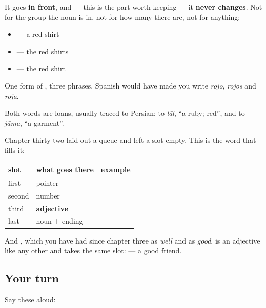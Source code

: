It goes \textbf{in front}, and — this is the part worth keeping — it \textbf{never changes}. Not for the group the noun is in, not for how many there are, not for anything:

\begin{itemize}
\raggedright
  \item \textbf{ } — a red shirt
  \item \textbf{ } — the red shirts
  \item \textbf{ } — the red shirt
\end{itemize}

One form of \textbf{}, three phrases. Spanish would have made you write \emph{rojo}, \emph{rojos} and \emph{roja}.

\begin{cousinweb}
Both words are loans, usually traced to Persian: \textbf{} to \emph{lāl}, \textquotedblleft{}a ruby; red\textquotedblright{}, and \textbf{} to \emph{jāma}, \textquotedblleft{}a garment\textquotedblright{}.
\end{cousinweb}

\begin{grammarlens}[title={Grammar Lens: the queue, filled in}]
Chapter thirty-two laid out a queue and left a slot empty. This is the word that fills it:

\noindent
\begin{tabularx}{\linewidth}{@{}>{\raggedright\arraybackslash}X>{\raggedright\arraybackslash}X>{\raggedright\arraybackslash}X@{}}
\toprule
\textbf{slot} & \textbf{what goes there} & \textbf{example} \\
\midrule
first & pointer & \textbf{\bn{এই}} \\
second & number & \textbf{\bn{একটা}} \\
third & \textbf{adjective} & \textbf{\bn{লাল}} \\
last & noun + ending & \textbf{\bn{জামা}} \\
\bottomrule
\end{tabularx}

And \textbf{}, which you have had since chapter three as \emph{well} and as \emph{good}, is an adjective like any other and takes the same slot: \textbf{ } — a good friend.
\end{grammarlens}

\subsection*{Your turn}
Say these aloud:

